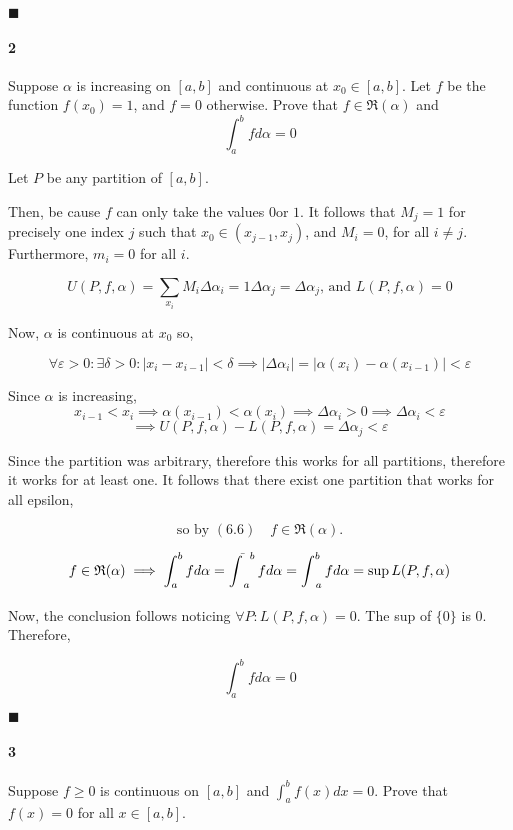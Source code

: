 \documentclass{article}
\begin{document}
$\blacksquare$

\newpage
\paragraph{2} Suppose $\alpha$ is increasing on $[a,b]$ and continuous
at $x_0\in[a,b]$. Let $f$ be the function $f(x_0) = 1$, and $f = 0$
otherwise. Prove that $f\in\mathfrak{R}(\alpha)$ and $$\int_a^b f d\alpha
= 0$$


Let $P$ be any partition of $[a,b]$.

Then, be cause $f$ can only take the values $0$or $1$. It follows that
$M_j
= 1$ for precisely one index $j$ such that  $x_0 \in (x_{j-1},x_j)$, and $M_i =
0$, for all $i\neq j$. Furthermore, $m_i = 0$ for all $i$.

$$U(P,f,\alpha) =\sum_{x_i}M_i\Delta\alpha_i = 1\Delta\alpha_j =\Delta\alpha_j  \text{, and } L(P,f,\alpha) = 0$$

Now, $\alpha$ is continuous at $x_0$ so,

$$\forall \varepsilon > 0: \exists \delta >0: |x_{i}-x_{i-1}|<\delta
\implies |\Delta\alpha_i| = |\alpha(x_i) -\alpha(x_{i-1})| < \varepsilon $$

Since $\alpha$ is increasing, $$x_{i-1} < x_i \implies \alpha(x_{i-1})
<\alpha(x_i) \implies \Delta\alpha_i >0 \implies \Delta\alpha_i < \varepsilon$$
$$\implies U(P,f,\alpha) - L(P,f,\alpha)  = \Delta\alpha_j < \varepsilon$$

Since the partition was arbitrary, therefore this works for all partitions,
therefore it works for at least one. It follows that there exist one
partition that works for all epsilon,

\[\text{so by }(6.6)\quad f\in \mathfrak{R}(\alpha).\]



\[f\in \mathfrak{R}(\alpha) \implies \int_a^b f d\alpha = \int_{\enskip
    a}^{\bar{}\enskip b} f d\alpha = \int_{\underbar{}\enskip a}^{b} f
  d\alpha = \sup L(P, f,\alpha)\]

Now, the conclusion follows noticing $\forall P: L(P, f,\alpha) =
0$. The sup of $\{0\}$ is $0$.  Therefore,

$$\int_a^b f d\alpha
= 0$$

$\blacksquare$

\newpage

\paragraph{3} Suppose $f \geq 0$ is continuous on $[a,b]$ and $\int_a^b f(x) dx
= 0$. Prove that $f(x) = 0$ for all $x \in [a,b].$
\end{document}
